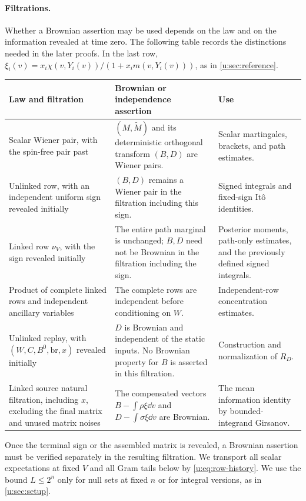 \paragraph{Filtrations.}
Whether a Brownian assertion may be used depends on the law and on the
information revealed at time zero. The following table records the
distinctions needed in the later proofs. In the last row,
$\xi_i(v)=x_i\chi(v,Y_i(v))/(1+x_i m(v,Y_i(v)))$, as in
\cref{u:sec:reference}.
\begin{center}
\small
\renewcommand{\arraystretch}{1.14}
\begin{tabular}{@{}>{\raggedright\arraybackslash}p{}
 >{\raggedright\arraybackslash}p{}
 >{\raggedright\arraybackslash}p{}@{}}
\toprule
Law and filtration & Brownian or independence assertion & Use \\
\midrule
Scalar Wiener pair, with the spin-free pair past
& $(M,\widetilde M)$ and its deterministic orthogonal transform
  $(B,D)$ are Wiener pairs.
& Scalar martingales, brackets, and path estimates. \\[3pt]
Unlinked row, with an independent uniform sign revealed initially
& $(B,D)$ remains a Wiener pair in the filtration including this sign.
& Signed integrals and fixed-sign It\^o identities. \\[3pt]
Linked row $\nu_V$, with the sign revealed initially
& The entire path marginal is unchanged; $B,D$ need not be Brownian
  in the filtration including the sign.
& Posterior moments, path-only estimates, and the previously defined
  signed integrals. \\[3pt]
Product of complete linked rows and independent ancillary variables
& The complete rows are independent before conditioning on $W$.
& Independent-row concentration estimates. \\[3pt]
Unlinked replay, with $(W,C,B^0,\mathrm{br},x)$ revealed initially
& $D$ is Brownian and independent of the static inputs. No Brownian
  property for $B$ is asserted in this filtration.
& Construction and normalization of $R_D$. \\[3pt]
Linked source natural filtration, including $x$, excluding the final
matrix and unused matrix noises
& The compensated vectors
  $B-\int\rho\xi\dd v$ and $D-\int\sigma\xi\dd v$ are Brownian.
& The mean information identity by bounded-integrand Girsanov. \\
\bottomrule
\end{tabular}
\end{center}
Once the terminal sign or the assembled matrix is revealed, a Brownian
assertion must be verified separately in the resulting filtration.
We transport all scalar expectations at fixed $V$ and all Gram tails below
by \eqref{u:eq:row-history}. We use the bound $L\le2^n$ only for
null sets at fixed $n$ or for integral versions, as in \cref{u:sec:setup}.

